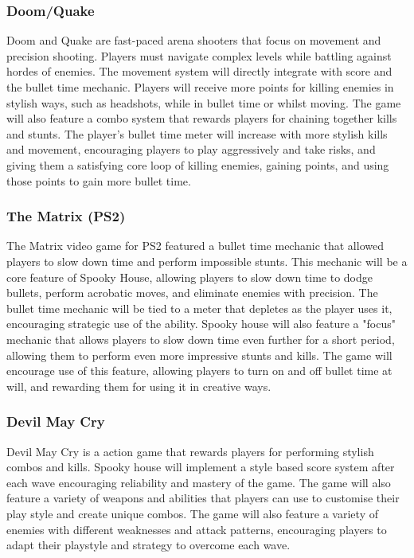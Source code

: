 \documentclass{article}
\begin{document}
    \subsubsection{Doom/Quake}
    Doom and Quake are fast-paced arena shooters that focus on movement and precision shooting.
    Players must navigate complex levels while battling against hordes of enemies.
    The movement system will directly integrate with score and the bullet time mechanic.
    Players will receive more points for killing enemies in stylish ways, such as headshots, while in bullet time or whilst moving.
    The game will also feature a combo system that rewards players for chaining together kills and stunts.
    The player's bullet time meter will increase with more stylish kills and movement, encouraging players to play aggressively and take risks, and giving them a satisfying core loop of killing enemies, gaining points, and using those points to gain more bullet time.

    \subsubsection{The Matrix (PS2)}
    The Matrix video game for PS2 featured a bullet time mechanic that allowed players to slow down time and perform impossible stunts.
    This mechanic will be a core feature of Spooky House, allowing players to slow down time to dodge bullets, perform acrobatic moves, and eliminate enemies with precision.
    The bullet time mechanic will be tied to a meter that depletes as the player uses it, encouraging strategic use of the ability.
    Spooky house will also feature a "focus" mechanic that allows players to slow down time even further for a short period, allowing them to perform even more impressive stunts and kills.
    The game will encourage use of this feature, allowing players to turn on and off bullet time at will, and rewarding them for using it in creative ways.

    \subsubsection{Devil May Cry}
    Devil May Cry is a action game that rewards players for performing stylish combos and kills.
    Spooky house will implement a style based score system after each wave encouraging reliability and mastery of the game.
    The game will also feature a variety of weapons and abilities that players can use to customise their play style and create unique combos.
    The game will also feature a variety of enemies with different weaknesses and attack patterns, encouraging players to adapt their playstyle and strategy to overcome each wave.
\end{document}
